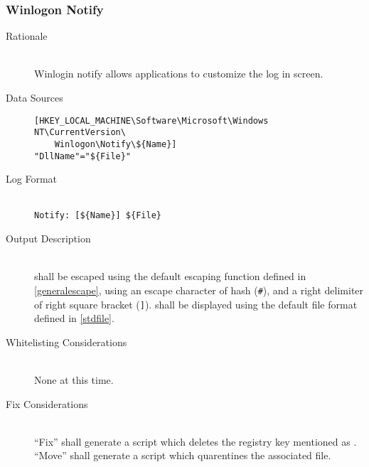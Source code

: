 \subsubsection{Winlogon Notify}
\begin{description}
\item[Rationale] \hfill \\
Winlogin notify allows applications to customize the log in screen.
\item[Data Sources] \hfill
\vspace{-\baselineskip}
\begin{verbatim}
[HKEY_LOCAL_MACHINE\Software\Microsoft\Windows NT\CurrentVersion\
    Winlogon\Notify\${Name}]
"DllName"="${File}"
\end{verbatim}
\item[Log Format] \hfill \\
\verb|Notify: [${Name}] ${File}|
\item[Output Description] \hfill \\
 shall be escaped using the default escaping function defined in
\ref{generalescape}, using an escape character of hash (\verb|#|), and a right
delimiter of right square bracket (\verb|]|). \var{File} shall be displayed
using the default file format defined in \ref{stdfile}.
\item[Whitelisting Considerations] \hfill \\
None at this time.
\item[Fix Considerations] \hfill \\
``Fix'' shall generate a script which deletes the registry key mentioned as
\var{Name}. ``Move'' shall generate a script which quarentines the associated
file.
\end{description}

